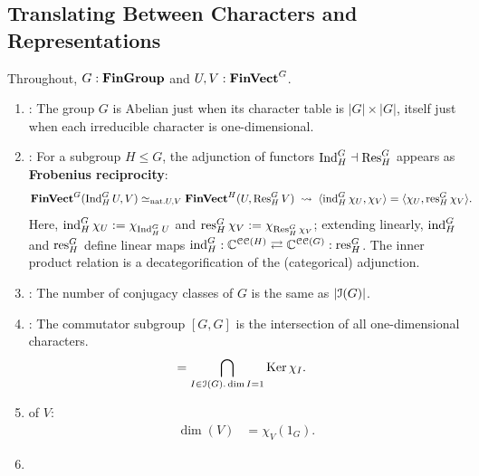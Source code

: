 \subsection{Translating Between Characters and Representations} \label{sec:translations-themselves} %
\pan Throughout, $G : \operatorname{\mathbf{FinGroup}}$ and $U, V : \operatorname{\mathbf{FinVect}}^G$.
\begin{enumerate}[leftmargin=*, label=(T\arabic*)]
  \item\label{trans:abelian-iff-big-character-table} {
    : The group $G$ is Abelian just when its character table is $\lvert G \rvert \times \lvert G \rvert$, itself just when each irreducible character is one-dimensional.
  }
  \item\label{trans:adjunction-induction-restriction} {
    : For a subgroup $H \leq G$, the adjunction of functors $\operatorname{Ind}_H^G \dashv \operatorname{Res}^G_H$ appears as \textbf{Frobenius reciprocity}:
    \begin{align*}
      \operatorname{\mathbf{FinVect}}^G(\operatorname{Ind}_H^G U, V)
      &\simeq_{\text{nat.} U, V} \operatorname{\mathbf{FinVect}}^H (U, \operatorname{Res}^G_H V)
      \;\rightsquigarrow\;
      \langle \operatorname{ind}_H^G \chi_U , \chi_V \rangle
      = \langle \chi_U, \operatorname{res}^G_H \chi_V \rangle
      .
    \end{align*}
    \pan Here, $\operatorname{ind}_H^G \chi_U := \chi_{\operatorname{Ind}_H^G U}$ and $\operatorname{res}^G_H \chi_V := \chi_{\operatorname{Res}^G_H \chi_V}$; extending linearly, $\operatorname{ind}_H^G$ and $\operatorname{res}^G_H$ define linear maps $\operatorname{ind}_H^G : \mathbb{C}^{\operatorname{\mathcal{CC}}(H)} \rightleftarrows \mathbb{C}^{\operatorname{\mathcal{CC}}(G)} : \operatorname{res}^G_H$. The inner product relation is a decategorification of the (categorical) adjunction.
  }
  \item\label{trans:class-number} {
    : The number of conjugacy classes of $G$ is the same as $\lvert \operatorname{\mathcal{I}}(G) \rvert$.
  }
  \item\label{trans:commutator} {
    : The commutator subgroup $[G, G]$ is the intersection of all one-dimensional characters.
    \begin{align*}
      [G, G]
      &= \bigcap_{I \in \Irred(G) . \dim I = 1}
        \Ker \chi_I
      .
    \end{align*}
  }
  \item\label{trans:dimension} {
     of $V$:
    \begin{align*}
      \dim(V)
      &= \chi_V (1_G)
      .
    \end{align*}
  }
  \item\label{trans:dimension-hom} {
}
\end{enumerate}
